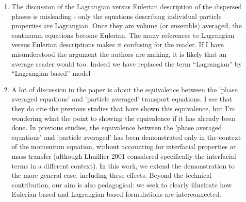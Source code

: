 \documentclass[10pt,a4paper]{article}
\newcommand{\tb}[1]{\color{blue}#1\color{black}}
\begin{document}
\begin{enumerate}
{    }
    \item The discussion of the Lagrangian versus Eulerian description of the dispersed phases is
    misleading - only the equations describing individual particle properties are Lagrangian.
    Once they are volume (or ensemble) averaged, the continuum equations become Eulerian.
    The many references to Lagrangian versus Eulerian descriptions makes it confusing for the
    reader. If I have misunderstood the argument the authors are making, it is likely that an
    average reader would too.
    \tb{Indeed we have replaced the term ``Lagrangian'' by ``Lagrangian-based'' model} %
    \item A lot of discussion in the paper is about the equivalence between the 'phase averaged
    equations' and 'particle averaged' transport equations. I see that they do cite the previous
    studies that have shown this equivalence, but I'm wondering what the point to showing the
    equivalence if it has already been done.
    \tb{
        In previous studies, the equivalence between the 'phase averaged equations' and 'particle averaged' has been demonstrated only in the context of the momentum equation, without accounting for interfacial properties or mass transfer (although Lhuillier 2001 considered specifically the interfacial terms in a different context).
        In this work, we extend the demonstration to the more general case, including these effects.
        Beyond the technical contribution, our aim is also pedagogical: we seek to clearly illustrate how Eulerian-based and Lagrangian-based formulations are interconnected.%

    }
\end{enumerate}
\end{document}
